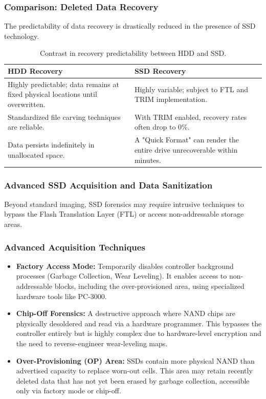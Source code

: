 \subsubsection*{Comparison: Deleted Data Recovery}
The predictability of data recovery is drastically reduced in the presence of SSD technology.

\begin{table}[H]
\centering
\small
\begin{tabular}{|p{5cm}|p{5cm}|}
\hline
\textbf{HDD Recovery} & \textbf{SSD Recovery} \\
\hline
Highly predictable; data remains at fixed physical locations until overwritten. & Highly variable; subject to FTL and TRIM implementation. \\
\hline
Standardized file carving techniques are reliable. & With TRIM enabled, recovery rates often drop to 0\%. \\
\hline
Data persists indefinitely in unallocated space. & A "Quick Format" can render the entire drive unrecoverable within minutes. \\
\hline
\end{tabular}
\caption{Contrast in recovery predictability between HDD and SSD.}
\end{table}

\subsubsection*{Advanced SSD Acquisition and Data Sanitization}

Beyond standard imaging, SSD forensics may require intrusive techniques to bypass the Flash Translation Layer (FTL) or access non-addressable storage areas.

\subsubsection*{Advanced Acquisition Techniques}
\begin{itemize}
    \item \textbf{Factory Access Mode:} Temporarily disables controller background processes (Garbage Collection, Wear Leveling). It enables access to non-addressable blocks, including the over-provisioned area, using specialized hardware tools like PC-3000.
    \item \textbf{Chip-Off Forensics:} A destructive approach where NAND chips are physically desoldered and read via a hardware programmer. This bypasses the controller entirely but is highly complex due to hardware-level encryption and the need to reverse-engineer wear-leveling maps.
    \item \textbf{Over-Provisioning (OP) Area:} SSDs contain more physical NAND than advertised capacity to replace worn-out cells. This area may retain recently deleted data that has not yet been erased by garbage collection, accessible only via factory mode or chip-off.
\end{itemize}

